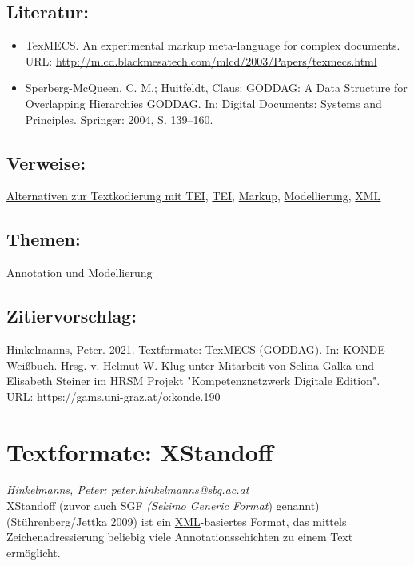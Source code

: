 \documentclass{article}
\begin{document}
        \subsection*{Literatur:}\begin{itemize}\item TexMECS. An experimental markup meta-language for complex documents. URL: \url{http://mlcd.blackmesatech.com/mlcd/2003/Papers/texmecs.html}\item Sperberg-McQueen, C. M.; Huitfeldt, Claus: GODDAG: A Data Structure for Overlapping Hierarchies GODDAG. In: Digital Documents: Systems and Principles. Springer: 2004, S. 139–160.\end{itemize}\subsection*{Verweise:}\href{https://gams.uni-graz.at/o:konde.15}{Alternativen zur Textkodierung mit TEI}, \href{https://gams.uni-graz.at/o:konde.178}{TEI}, \href{https://gams.uni-graz.at/o:konde.126}{Markup}, \href{https://gams.uni-graz.at/o:konde.137}{Modellierung}, \href{https://gams.uni-graz.at/o:konde.215}{XML}\subsection*{Themen:}Annotation und Modellierung\subsection*{Zitiervorschlag:}Hinkelmanns, Peter. 2021. Textformate: TexMECS (GODDAG). In: KONDE Weißbuch. Hrsg. v. Helmut W. Klug unter Mitarbeit von Selina Galka und Elisabeth Steiner im HRSM Projekt "Kompetenznetzwerk Digitale Edition". URL: https://gams.uni-graz.at/o:konde.190\newpage\section*{Textformate: XStandoff} \emph{Hinkelmanns, Peter; peter.hinkelmanns@sbg.ac.at }\\
        
    XStandoff (zuvor auch SGF \emph{(Sekimo Generic Format}) genannt) (Stührenberg/Jettka 2009) ist ein \href{http://gams.uni-graz.at/o:konde.215}{XML}-basiertes Format, das mittels Zeichenadressierung beliebig viele Annotationsschichten zu einem Text ermöglicht.\\
            
\end{document}
